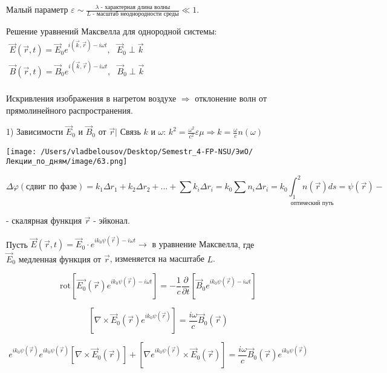 \documentclass[12pt, a4paper]{report}
\begin{document}
Малый параметр \(\displaystyle  \varepsilon \sim  \frac{ \lambda\text{ - характерная длина волны} }{L \text{  - масштаб неоднородности среды}}  \ll 1   \).

Решение уравнений Максвелла для однородной системы: \( \begin{aligned}
\vec{E } (\vec{r },t     ) = \vec{E }_0  e^{i (\vec{k } ,\vec{r}) - i \omega t  }  , \text{  }  \vec{E }_0 \perp \vec{k } \\
\vec{B } (\vec{r },t     ) = \vec{B }_0  e^{i (\vec{k } ,\vec{r}) - i \omega t  }  , \text{  }  \vec{B }_0 \perp \vec{k } \\
\end{aligned} \) 


Искривления изображения в нагретом воздухе \( \Rightarrow \)  отклонение волн от прямолинейного распространения.

1) Зависимости \( \vec{E } _0  \) и \( \vec{B } _0  \) от \( \vec{r } | \)  Связь \( k \) и \( \omega \): \( \displaystyle  k ^2 = \frac{ \omega ^2 } { c ^2 }\varepsilon \mu \Rightarrow k = \frac{\omega }{c } n(\omega)   \) 

\begin{center}
    \texttt{[image: /Users/vladbelousov/Desktop/Semestr\_4-FP-NSU/ЭиО/Лекции\_по\_дням/image/63.png]}
\end{center}

\[ \Delta \varphi (\text{сдвиг по фазе} ) = k_1 \Delta r_1 + k_2 \Delta r_2 +... + \sum  k_i \Delta r_i = k_0 \sum n_i \Delta r_i = k_0 \underset{\text{оптический путь} }{\int_{1 }^{2 } n(\vec{r } )ds }= \psi (\vec{r} ) -\] 

- скалярная функция \( \vec{r}  \) - эйконал.

Пусть \( \vec{E } ( \vec{r } ,t ) = \vec{E } _0  \cdot e^{ i k_0 \psi (\vec{r } ) - i \omega t}  \to  \text{ в уравнение Максвелла} \), где \( \vec{E } _0\text { медленная функция от  } \vec{r }   \),  изменяется на масштабе \( L  \).

\[ \mathrm{rot } \left[ \vec{E_0 }(\vec{r } ) e^{i k_0 \psi (\vec{r } )- i \omega t }   \right] = -\frac{1}{c} \frac{\partial  }{\partial  t } \left[ \vec{B }_0 e^{i k_0 \psi (\vec{r } )- i \omega t}   \right]   \] 

\[ \left[ \nabla \times  \vec{E } _0 ( \vec{r } ) e^{i k_0 \psi (\vec{r} )}  \right] = \frac{i \omega }{c } \vec{B } _0 (\vec{r } ) \] 

\[  e^{i k_0 \psi (\vec{r } )} e^{ i k_0 \psi (\vec{r} )} \left[ \nabla \times  \vec{E } _0 (\vec{r } ) \right] + \left[ \nabla e^{ i k_0 \psi (\vec{r } )} \times  \vec{E }  _ 0 (\vec{r} )  \right] = \frac{i \omega }{c } \vec{B } _0 (\vec{r } ) e^{i k_0 \psi (\vec{r } )} \] 
\end{document}
